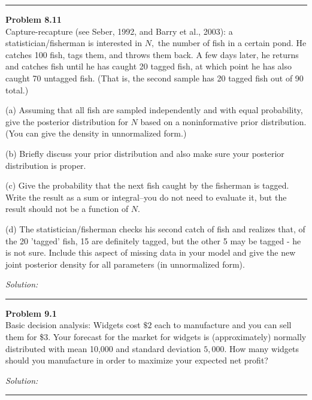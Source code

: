\documentclass[a4paper, 11pt]{article}
\newenvironment{problem}[2][Problem]
    { \begin{mdframed}[backgroundcolor=gray!20] \textbf{#1 #2} \\}
    {  \end{mdframed}}
\newenvironment{solution}
    {\textit{Solution:}}
    {}
\begin{document}
\noindent\rule{7in}{2.8pt}
\begin{problem}{8.11}
Capture-recapture (see Seber, 1992, and Barry et al., 2003): a statistician/fisherman is interested in $N,$ the number of fish in a certain pond. He catches 100 fish, tags them, and throws them back. A few days later, he returns and catches fish until he has caught 20 tagged fish, at which point he has also caught 70 untagged fish. (That is, the second sample has 20 tagged fish out of 90 total.)

(a) Assuming that all fish are sampled independently and with equal probability, give the posterior distribution for $N$ based on a noninformative prior distribution. (You can give the density in unnormalized form.)

(b) Briefly discuss your prior distribution and also make sure your posterior distribution is proper.

(c) Give the probability that the next fish caught by the fisherman is tagged. Write the result as a sum or integral--you do not need to evaluate it, but the result should not be a function of $N$.

(d) The statistician/fisherman checks his second catch of fish and realizes that, of the 20 'tagged' fish, 15 are definitely tagged, but the other 5 may be tagged - he is not sure. Include this aspect of missing data in your model and give the new joint posterior density for all parameters (in unnormalized form).
	
\end{problem}
\begin{solution}
	
	
	
\end{solution}

\noindent\rule{7in}{2.8pt}
\begin{problem}{9.1}
Basic decision analysis: Widgets cost $\$ 2$ each to manufacture and you can sell them for
\$3. Your forecast for the market for widgets is (approximately) normally distributed with mean 10,000 and standard deviation $5,000 .$ How many widgets should you manufacture
in order to maximize your expected net profit?

\end{problem}
\begin{solution}
	
	
	
\end{solution}

\noindent\rule{7in}{2.8pt}
\end{document}
